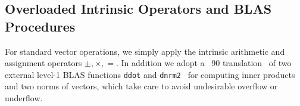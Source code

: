 \documentclass{doc_acmtrans2m}
\begin{document}

\subsection{Overloaded Intrinsic Operators and BLAS Procedures}

For standard vector operations, we simply apply the intrinsic
arithmetic and assignment operators $\pm, \times, =$.  In addition we
adopt a \FORTRAN~90 translation~ of two external
level-1 BLAS functions \texttt{ddot} and
\texttt{dnrm2}~ for computing inner products and two
norms of vectors, which take care to avoid undesirable overflow or
underflow.
\end{document}
